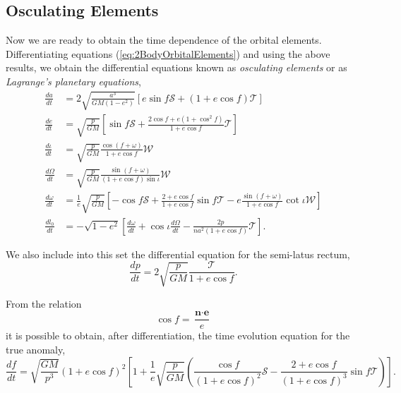 \subsection{Osculating Elements}
Now we are ready to obtain the time dependence of the orbital elements. Differentiating equations (\ref{eq:2BodyOrbitalElements}) and using the above results, we obtain the differential equations known as \textit{osculating elements} or as \textit{Lagrange's planetary equations},
\begin{subequations}\label{eq:OsculatingOrbitalElements}
\begin{align}
\frac{da}{dt} &= 2\sqrt{\frac{a^3}{GM (1-e^2)}} \left[ e \sin f \mathcal{S} + (1+e\cos f) \mathcal{T} \right] \\
\frac{de}{dt} &= \sqrt{\frac{p}{GM}} \left[ \sin f \mathcal{S} + \frac{2\cos f + e \left( 1 + \cos^2 f \right) }{1 + e\cos f} \mathcal{T} \right] \\
\frac{d \iota}{dt} &= \sqrt{\frac{p}{GM}} \frac{\cos (f+\omega)}{1+e\cos f} \mathcal{W} \\
\frac{d \Omega}{dt} &= \sqrt{\frac{p}{GM}} \frac{\sin (f+\omega)}{(1+e\cos f)\sin \iota } \mathcal{W} \\
\frac{d\omega}{dt} &=\frac{1}{e}\sqrt{\frac{p}{GM}} \left[ -\cos f \mathcal{S} + \frac{2+e\cos f}{1 + e \cos f} \sin f \mathcal{T} - e  \frac{\sin (f + \omega)}{1 + e \cos f} \cot \iota \mathcal{W} \right] \\
\frac{dl_0}{dt} &= -\sqrt{1-e^2} \left[ \frac{d\omega}{dt} + \cos \iota \frac{d\Omega}{dt} - \frac{2p}{na^2 (1+e \cos f)} \mathcal{T} \right] .
\end{align}
\end{subequations}

We also include into this set the differential equation for the semi-latus rectum,
\begin{equation}
\frac{dp}{dt} = 2 \sqrt{\frac{p}{GM}} \frac{\mathcal{T}}{1+e\cos f} .
\end{equation}

From the relation
\begin{equation}
 \cos f = \frac{\textbf{n} \cdot \textbf{e}}{e}
 \end{equation} 
it is possible to obtain, after differentiation, the time evolution equation for the true anomaly,
 \begin{equation}
\frac{df}{dt} = \sqrt{\frac{GM}{p^3}} \left( 1 + e \cos f \right)^2 \left[ 1 + \frac{1}{e}\sqrt{\frac{p}{GM}} \left( \frac{\cos f}{(1+e \cos f) ^2} \mathcal{S} - \frac{2+e\cos f}{(1 + e\cos f)^3} \sin f \mathcal{T} \right) \right]. \label{eq:TrueAnomalyOsculatingEquation}
 \end{equation} 
 
